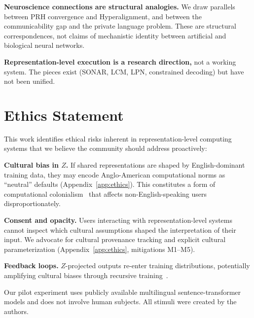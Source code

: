 \documentclass{article}
\theoremstyle{definition}
\begin{document}
\textbf{Neuroscience connections are structural analogies.} We draw parallels between PRH convergence and Hyperalignment, and between the communicability gap and the private language problem. These are structural correspondences, not claims of mechanistic identity between artificial and biological neural networks.

\textbf{Representation-level execution is a research direction,} not a working system. The pieces exist (SONAR, LCM, LPN, constrained decoding) but have not been unified.


\section*{Ethics Statement}

This work identifies ethical risks inherent in representation-level computing systems that we believe the community should address proactively:

\textbf{Cultural bias in $Z$.} If shared representations are shaped by English-dominant training data, they may encode Anglo-American computational norms as ``neutral'' defaults (Appendix~\ref{app:ethics}). This constitutes a form of computational colonialism~\citep{phillipson1992} that affects non-English-speaking users disproportionately.

\textbf{Consent and opacity.} Users interacting with representation-level systems cannot inspect which cultural assumptions shaped the interpretation of their input. We advocate for cultural provenance tracking and explicit cultural parameterization (Appendix~\ref{app:ethics}, mitigations M1--M5).

\textbf{Feedback loops.} $Z$-projected outputs re-enter training distributions, potentially amplifying cultural biases through recursive training~\citep{shumailov2024collapse}.

Our pilot experiment uses publicly available multilingual sentence-transformer models and does not involve human subjects. All stimuli were created by the authors.




\end{document}
